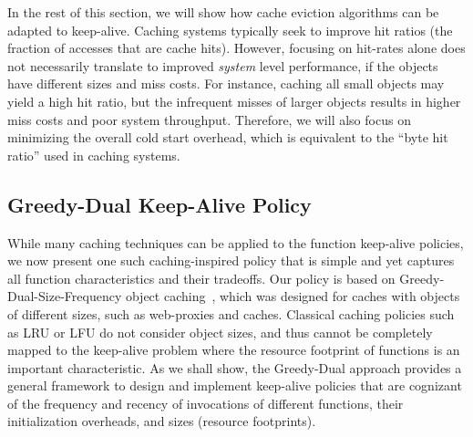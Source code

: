 In the rest of this section, we will show how cache eviction algorithms can be adapted to keep-alive.
Caching systems typically seek to improve hit ratios (the fraction of accesses that are cache hits).
However, focusing on hit-rates alone does not necessarily translate to improved \emph{system} level performance, if the objects have different sizes and miss costs.
For instance, caching all small objects may yield a high hit ratio, but the infrequent misses of larger objects results in higher miss costs and poor system throughput. 
Therefore, we will also focus on minimizing the overall cold start overhead, which is equivalent to the ``byte hit ratio'' used in caching systems.







\subsection{Greedy-Dual Keep-Alive Policy}
\label{subsec:gdsf}
\vspace*{\subsecspace}

While many caching techniques can be applied to the function keep-alive policies, we now present one such caching-inspired policy that is simple and yet captures all function characteristics and their tradeoffs.
Our policy is based on Greedy-Dual-Size-Frequency object caching~\cite{gdsf}, which was designed for caches with objects of  different sizes, such as web-proxies and caches. 
Classical caching policies such as LRU or LFU do not consider object sizes, and thus cannot be completely mapped to the keep-alive problem where the resource footprint of functions is an important characteristic. 
As we shall show, the Greedy-Dual approach provides a general framework to design and implement keep-alive policies that are cognizant of the  frequency and recency of invocations of different functions, their initialization overheads, and sizes (resource footprints). 


